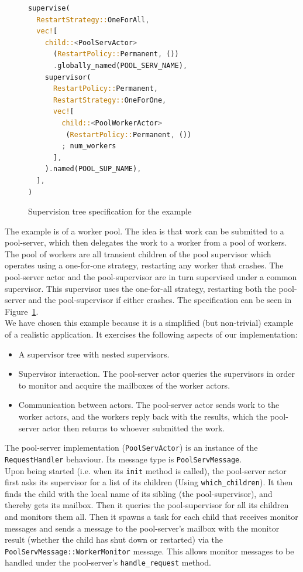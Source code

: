 \documentclass[a4paper]{article}
\newcommand\figref[1]{Figure~\ref{#1}}
\begin{document}
\begin{figure}
\begin{lstlisting}[language=Rust,basicstyle=\footnotesize]
supervise(
  RestartStrategy::OneForAll,
  vec![
    child::<PoolServActor>
      (RestartPolicy::Permanent, ())
      .globally_named(POOL_SERV_NAME),
    supervisor(
      RestartPolicy::Permanent,
      RestartStrategy::OneForOne,
      vec![
        child::<PoolWorkerActor>
         (RestartPolicy::Permanent, ())
        ; num_workers
      ],
    ).named(POOL_SUP_NAME),
  ],
)
\end{lstlisting}
  \caption{Supervision tree specification for the example}
  \label{fig:ex-spec}
\end{figure}

\noindent
The example is of a worker pool. The idea is that work can be submitted to a
pool-server, which then delegates the work to a worker from a pool of workers.
The pool of workers are all transient children of the pool supervisor which
operates using a one-for-one strategy, restarting any worker that crashes. The
pool-server actor and the pool-supervisor are in turn supervised under a common
supervisor. This supervisor uses the one-for-all strategy, restarting both the
pool-server and the pool-supervisor if either crashes. The specification can be
seen in \figref{fig:ex-spec}.\\

\noindent
We have chosen this example because it is a simplified (but non-trivial) example
of a realistic application. It exercises the following aspects of our
implementation:
\begin{itemize}
\item A supervisor tree with nested supervisors.
\item Supervisor interaction. The pool-server actor queries the supervisors in order
  to monitor and acquire the mailboxes of the worker actors.
\item Communication between actors. The pool-server actor sends work to the
  worker actors, and the workers reply back with the results, which the
  pool-server actor then returns to whoever submitted the work.
\end{itemize}

\noindent
The pool-server implementation (\texttt{PoolServActor}) is an instance of the
\texttt{RequestHandler} behaviour. Its message type is
\texttt{PoolServMessage}.\\

\noindent
Upon being started (i.e. when its \texttt{init} method
is called), the pool-server actor first asks its supervisor for a list of its
children (Using \texttt{which\_children}). It then finds the child with the
local name of its sibling (the pool-supervisor), and thereby gets its mailbox.
Then it queries the pool-supervisor for all its children and monitors them all.
Then it spawns a task for each child that receives monitor messages and sends a
message to the pool-server's mailbox with the monitor result (whether the child
has shut down or restarted) via the \texttt{{PoolServMessage::WorkerMonitor}}
message. This allows monitor messages to be handled under the pool-server's
\texttt{handle\_request} method.\\
\end{document}
